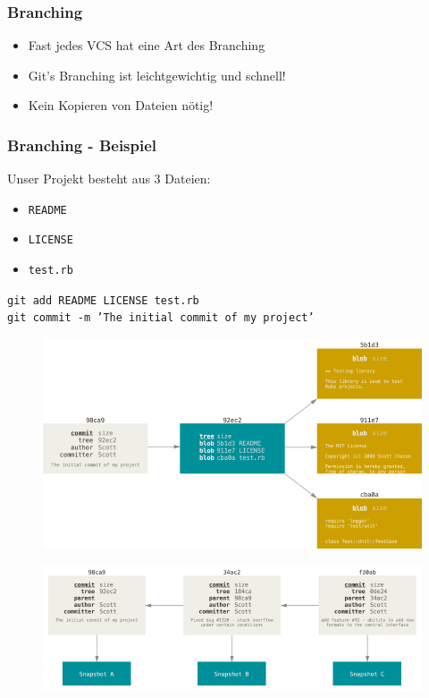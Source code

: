 \documentclass[12pt,utf8]{beamer}
\begin{document}
	\begin{frame}
		\frametitle{Branching}	
		\begin{itemize}
			\item Fast jedes VCS hat eine Art des Branching
			\item Git's Branching ist leichtgewichtig und schnell!
			\item Kein Kopieren von Dateien nötig!
		\end{itemize}
	\end{frame}

	\begin{frame}
		\frametitle{Branching - Beispiel}
		Unser Projekt besteht aus 3 Dateien:
		\begin{itemize}
			\item[] \texttt{README}
			\item[] \texttt{LICENSE}
			\item[] \texttt{test.rb}
		\end{itemize}
	
		\texttt{git add README LICENSE test.rb}\\
		\texttt{git commit -m 'The initial commit of my project'}
	\end{frame}
	
	\begin{frame}
		\begin{figure}
			\includegraphics[scale=0.4]{resources/commit-and-tree.png}
			
			\tiny{\cite{commit-and-tree}}
		\end{figure}
	\end{frame}

	\begin{frame}
		\begin{figure}
			\includegraphics[scale=0.4]{resources/commits-and-parents.png}
			
			\tiny{\cite{commit-and-parents}}
		\end{figure}
	\end{frame}
\end{document}

